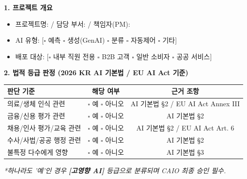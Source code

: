 \begin{tcolorbox}[colback=white, colframe=blue, title={[Template C.1] AI 영향 평가 결과 보고서}]
\textbf{1. 프로젝트 개요}
\begin{itemize}
    \item 프로젝트명: \underline{\hspace{4cm}} / 담당 부서: \underline{\hspace{3cm}} / 책임자(PM): \underline{\hspace{2cm}}
    \item AI 유형: [$\square$ 예측 $\square$ 생성(GenAI) $\square$ 분류 $\square$ 자동제어 $\square$ 기타]
    \item 배포 대상: [$\square$ 내부 직원 전용 $\square$ B2B 고객 $\square$ 일반 소비자 $\square$ 공공 서비스]
\end{itemize}

\textbf{2. 법적 등급 판정 (2026 KR AI 기본법 / EU AI Act 기준)}
\begin{center}
\begin{tabular}{|p{6cm}|c|c|}
\hline
\textbf{판단 기준} & \textbf{해당 여부} & \textbf{근거 조항} \\ \hline
의료/생체 인식 관련 & $\square$ 예 $\square$ 아니오 & AI 기본법 §2 / EU AI Act Annex III \\ \hline
금융/신용 평가 관련 & $\square$ 예 $\square$ 아니오 & AI 기본법 §2 \\ \hline
채용/인사 평가/교육 관련 & $\square$ 예 $\square$ 아니오 & AI 기본법 §2 / EU AI Act Art. 6 \\ \hline
수사/사법/공공 행정 관련 & $\square$ 예 $\square$ 아니오 & AI 기본법 §2 \\ \hline
불특정 다수에게 영향 & $\square$ 예 $\square$ 아니오 & AI 기본법 §3 \\ \hline
\end{tabular}
\end{center}
\textit{*하나라도 '예'인 경우 \textbf{[고영향 AI]} 등급으로 분류되며 CAIO 최종 승인 필수.}


\end{tcolorbox}
